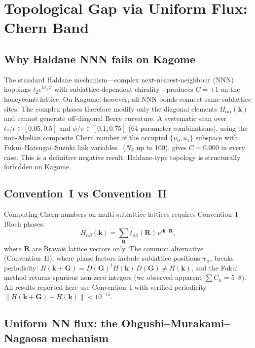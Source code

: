 \documentclass[aps,prb,twocolumn,superscriptaddress,floatfix]{revtex4-2}
\begin{document}
\section{Topological Gap via Uniform Flux: Chern Band}
\label{sec:chern}

\subsection{Why Haldane NNN fails on Kagome}

The standard Haldane mechanism---complex next-nearest-neighbour (NNN) hoppings $t_2 e^{i\nu_{ij}\phi}$ with sublattice-dependent chirality---produces $C = \pm 1$ on the honeycomb lattice. On Kagome, however, all NNN bonds connect same-sublattice sites. The complex phases therefore modify only the diagonal elements $H_{\alpha\alpha}(\mathbf{k})$ and cannot generate off-diagonal Berry curvature. A systematic scan over $t_2/t \in [0.05, 0.5]$ and $\phi/\pi \in [0.1, 0.75]$ (64 parameter combinations), using the non-Abelian composite Chern number of the occupied $\{u_0, u_1\}$ subspace with Fukui--Hatsugai--Suzuki link variables~\cite{fukui2005} ($N_k$ up to 100), gives $C = 0.000$ in every case. This is a definitive negative result: Haldane-type topology is structurally forbidden on Kagome.

\subsection{Convention~I vs Convention~II}
\label{sec:convention}

Computing Chern numbers on multi-sublattice lattices requires Convention~I Bloch phases:
\begin{equation}
    H_{\alpha\beta}(\mathbf{k}) = \sum_{\mathbf{R}} t_{\alpha\beta}(\mathbf{R})\,e^{i\mathbf{k}\cdot\mathbf{R}},
    \label{eq:convI}
\end{equation}
where $\mathbf{R}$ are Bravais lattice vectors only. The common alternative (Convention~II), where phase factors include sublattice positions $\boldsymbol{\tau}_\alpha$, breaks periodicity: $H(\mathbf{k}+\mathbf{G}) = D(\mathbf{G})^\dagger H(\mathbf{k})\,D(\mathbf{G}) \neq H(\mathbf{k})$, and the Fukui method returns spurious non-zero integers (we observed apparent $\sum C_n = 5$--$8$). All results reported here use Convention~I with verified periodicity $\|H(\mathbf{k}+\mathbf{G}) - H(\mathbf{k})\| < 10^{-15}$.

\subsection{Uniform NN flux: the Ohgushi--Murakami--Nagaosa mechanism}
\end{document}
